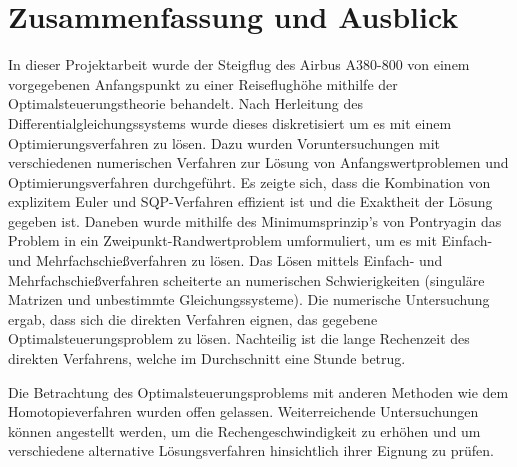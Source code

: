 \chapter{Zusammenfassung und Ausblick}

In dieser Projektarbeit wurde der Steigflug des Airbus A380-800 von einem vorgegebenen Anfangspunkt zu einer Reiseflughöhe mithilfe der Optimalsteuerungstheorie behandelt.  Nach Herleitung des Differentialgleichungssystems wurde dieses diskretisiert um es mit einem Optimierungsverfahren zu lösen. Dazu wurden Voruntersuchungen mit verschiedenen numerischen Verfahren zur Lösung von Anfangswertproblemen und Optimierungsverfahren durchgeführt. Es zeigte sich, dass die Kombination von explizitem Euler und SQP-Verfahren effizient ist und die Exaktheit der Lösung gegeben ist. Daneben wurde mithilfe des Minimumsprinzip's von Pontryagin das Problem in ein Zweipunkt-Randwertproblem umformuliert, um es mit Einfach- und Mehrfachschießverfahren zu lösen. Das Lösen mittels Einfach- und Mehrfachschießverfahren scheiterte an numerischen Schwierigkeiten (singuläre Matrizen und unbestimmte Gleichungssysteme). Die numerische Untersuchung ergab, dass sich die direkten Verfahren eignen, das gegebene Optimalsteuerungsproblem zu lösen.  Nachteilig ist die lange Rechenzeit des direkten Verfahrens, welche im Durchschnitt eine Stunde betrug. 

Die Betrachtung des Optimalsteuerungsproblems mit anderen Methoden wie dem Homotopieverfahren wurden offen gelassen. Weiterreichende Untersuchungen können angestellt werden, um die Rechengeschwindigkeit zu erhöhen und um verschiedene alternative Lösungsverfahren hinsichtlich ihrer Eignung zu prüfen.